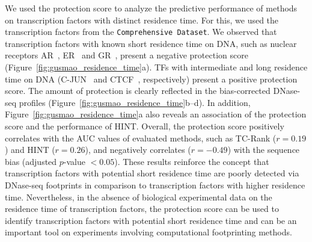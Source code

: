 We used the protection score to analyze the predictive performance of methods on transcription factors with distinct residence time. For this, we used the transcription factors from the {\tt Comprehensive Dataset}. We observed that transcription factors with known short residence time on DNA, such as nuclear receptors AR~\cite{tewari2012}, ER~\cite{sharp2006} and GR~\cite{mcnally2000}, present a negative protection score (Figure~\ref{fig:gusmao_residence_time}a). TFs with intermediate and long residence time on DNA (C-JUN~\cite{malnou2010} and CTCF~\cite{nakahashi2013}, respectively) present a positive protection score. The amount of protection is clearly reflected in the bias-corrected DNase-seq profiles (Figure~\ref{fig:gusmao_residence_time}b--d). In addition, Figure~\ref{fig:gusmao_residence_time}a also reveals an association of the protection score and the performance of HINT. Overall, the protection score positively correlates with the AUC values of evaluated methods, such as TC-Rank ($r = 0.19$) and HINT ($r = 0.26$), and negatively correlates ($r = -0.49$) with the sequence bias (adjusted $p$-value $< 0.05$). These results reinforce the concept that transcription factors with potential short residence time are poorly detected via DNase-seq footprints in comparison to transcription factors with higher residence time. Nevertheless, in the absence of biological experimental data on the residence time of transcription factors, the protection score can be used to identify transcription factors with potential short residence time and can be an important tool on experiments involving computational footprinting methods.

